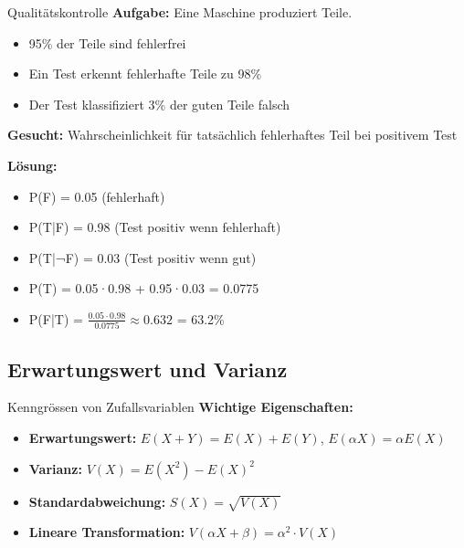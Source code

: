 \begin{example}{Qualitätskontrolle}
\textbf{Aufgabe:} Eine Maschine produziert Teile. 
\begin{itemize}
\item 95\% der Teile sind fehlerfrei
\item Ein Test erkennt fehlerhafte Teile zu 98\%
\item Der Test klassifiziert 3\% der guten Teile falsch
\end{itemize}

\textbf{Gesucht:} Wahrscheinlichkeit für tatsächlich fehlerhaftes Teil bei positivem Test

\textbf{Lösung:}
\begin{itemize}
\item P(F) = 0.05 (fehlerhaft)
\item P(T|F) = 0.98 (Test positiv wenn fehlerhaft)
\item P(T|¬F) = 0.03 (Test positiv wenn gut)
\item P(T) = 0.05·0.98 + 0.95·0.03 = 0.0775
\item P(F|T) = $\frac{0.05 \cdot 0.98}{0.0775} \approx 0.632$ = 63.2\%
\end{itemize}
\end{example}

\subsection{Erwartungswert und Varianz}

\begin{concept}{Kenngrössen von Zufallsvariablen}
\textbf{Wichtige Eigenschaften:}
\begin{itemize}
    \item \textbf{Erwartungswert:} $E(X + Y) = E(X) + E(Y)$, $E(\alpha X) = \alpha E(X)$
    \item \textbf{Varianz:} $V(X) = E(X^2) - E(X)^2$
    \item \textbf{Standardabweichung:} $S(X) = \sqrt{V(X)}$
    \item \textbf{Lineare Transformation:} $V(\alpha X + \beta) = \alpha^2 \cdot V(X)$
\end{itemize}
\end{concept}

